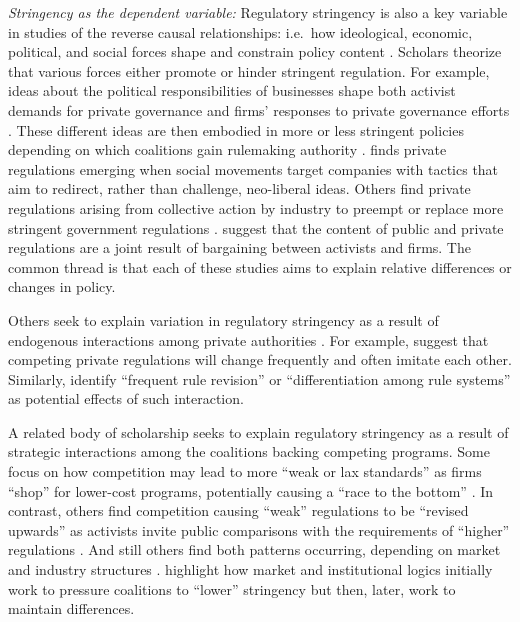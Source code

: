 \documentclass[
      12pt,
            Review ]{article}
\begin{document}
\emph{Stringency as the dependent variable:} Regulatory stringency is also a key variable in studies of the reverse causal relationships: i.e.~how ideological, economic, political, and social forces shape and constrain policy content \citep{Bartley2003, Cashore2004, Fischer2014}.
Scholars theorize that various forces either promote or hinder stringent regulation. For example, ideas about the political responsibilities of businesses shape both activist demands for private governance and firms' responses to private governance efforts \citep{Bartley2003, Djelic2017}. These different ideas are then embodied in more or less stringent policies depending on which coalitions gain rulemaking authority \citep{Botzem2012, Hsueh2012}. \citet{Bartley2003} finds private regulations emerging when social movements target companies with tactics that aim to redirect, rather than challenge, neo-liberal ideas. Others find private regulations arising from collective action by industry to preempt or replace more stringent government regulations \citep{Bartley2007, Cashore2002, Grabosky2013, Green2013, Loconto2014, Lyon2008, Maxwell2000, Prakash2000}. \citet{Abbott2009} suggest that the content of public and private regulations are a joint result of bargaining between activists and firms. The common thread is that each of these studies aims to explain relative differences or changes in policy.

Others seek to explain variation in regulatory stringency as a result of endogenous interactions among private authorities \citep{DeLeon2009, Eberlein2014, Green2017, Gulbrandsen2014, Howard-Grenville2008, Li2015, Mills2016d}. For example, \citet{Smith2010} suggest that competing private regulations will change frequently and often imitate each other. Similarly, \citet{Eberlein2014} identify ``frequent rule revision'' or ``differentiation among rule systems'' as potential effects of such interaction.

A related body of scholarship seeks to explain regulatory stringency as a result of strategic interactions among the coalitions backing competing programs. Some focus on how competition may lead to more ``weak or lax standards'' as firms ``shop'' for lower-cost programs, potentially causing a ``race to the bottom'' \citep{Abbott2010, Fransen2011, Gulbrandsen2004}. In contrast, others find competition causing ``weak'' regulations to be ``revised upwards'' as activists invite public comparisons with the requirements of ``higher'' regulations \citep{Overdevest2005, Overdevest2010}. And still others find both patterns occurring, depending on market and industry structures \citep{Cashore2004, Hassel2008, VanderVen2015}. \citet{Cashore2004} highlight how market and institutional logics initially work to pressure coalitions to ``lower'' stringency but then, later, work to maintain differences.
\end{document}
